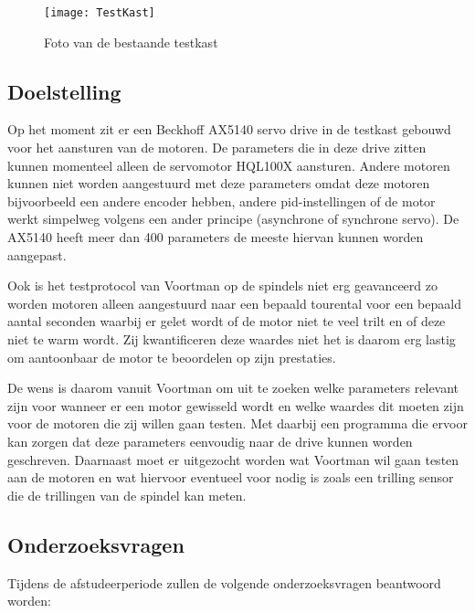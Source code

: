 \begin{figure}[h]
	\centering
	\texttt{[image: TestKast]}
	\label{fig:TestKastFoto}
	\caption{Foto van de bestaande testkast}
\end{figure}

\newpage

\subsection{Doelstelling}

Op het moment zit er een Beckhoff \gls{AX5140} servo drive in de testkast gebouwd voor het aansturen van de motoren. De parameters die in deze drive zitten kunnen momenteel alleen de servomotor HQL100X aansturen. Andere motoren kunnen niet worden aangestuurd met deze parameters omdat deze motoren bijvoorbeeld een andere encoder hebben, andere \gls{pid}-instellingen of de motor werkt simpelweg volgens een ander principe (asynchrone of synchrone servo). De \gls{AX5140} heeft meer dan 400 parameters de meeste hiervan kunnen worden aangepast.

\vspace{0.5cm}

Ook is het testprotocol van Voortman op de spindels niet erg geavanceerd zo worden motoren alleen aangestuurd naar een bepaald tourental voor een bepaald aantal seconden waarbij er gelet wordt of de motor niet te veel trilt en of deze niet te warm wordt. Zij kwantificeren deze waardes niet het is daarom erg lastig om aantoonbaar de motor te beoordelen op zijn prestaties.

\vspace{0.5cm}

De wens is daarom vanuit Voortman om uit te zoeken welke parameters relevant zijn voor wanneer er een motor gewisseld wordt en welke waardes dit moeten zijn voor de motoren die zij willen gaan testen. Met daarbij een programma die ervoor kan zorgen dat deze parameters eenvoudig naar de drive kunnen worden geschreven. Daarnaast moet er uitgezocht worden wat Voortman wil gaan testen aan de motoren en wat hiervoor eventueel voor nodig is zoals een trilling sensor die de trillingen van de spindel kan meten.

\newpage

\subsection{Onderzoeksvragen}

Tijdens de afstudeerperiode zullen de volgende onderzoeksvragen beantwoord worden:

